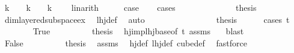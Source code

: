 \begin{isabellebody}
\ {\isachardoublequoteopen}k\ {\isacharequal}{\kern0pt}\ {}{\isachardoublequoteclose}\ {\isacharbar}{\kern0pt}\ {\isachardoublequoteopen}k\ {\isacharequal}{\kern0pt}\ {}{\isachardoublequoteclose}\ {\isacharbar}{\kern0pt}\ {\isachardoublequoteopen}k\ {\isasymge}\ {}{\isachardoublequoteclose}\ \isamarkupfalse%
\ linarith\isanewline
\ \ \isamarkupfalse%
\ \isamarkupfalse%
\ {\isacharquery}{\kern0pt}case\isanewline
\ \ \isamarkupfalse%
\ {\isacharparenleft}{\kern0pt}cases{\isacharparenright}{\kern0pt}\isanewline
\ \ \ \ \isamarkupfalse%
\ {}\isanewline
\ \ \ \ \isamarkupfalse%
\ \isamarkupfalse%
\ {\isacharquery}{\kern0pt}thesis\ \isamarkupfalse%
\ dim{}{\isacharunderscore}{\kern0pt}layered{\isacharunderscore}{\kern0pt}subspace{\isacharunderscore}{\kern0pt}ex\ \isamarkupfalse%
\ lhj{\isacharunderscore}{\kern0pt}def\ \isamarkupfalse%
\ auto\isanewline
\ \ \isamarkupfalse%
\isanewline
\ \ \ \ \isamarkupfalse%
\ {}\isanewline
\ \ \ \ \isamarkupfalse%
\ \isamarkupfalse%
\ {\isacharquery}{\kern0pt}thesis\isanewline
\ \ \ \ \isamarkupfalse%
\ {\isacharparenleft}{\kern0pt}cases\ {\isachardoublequoteopen}t\ {\isachargreater}{\kern0pt}\ {}{\isachardoublequoteclose}{\isacharparenright}{\kern0pt}\isanewline
\ \ \ \ \ \ \isamarkupfalse%
\ True\isanewline
\ \ \ \ \ \ \isamarkupfalse%
\ \isamarkupfalse%
\ {\isacharquery}{\kern0pt}thesis\ \isamarkupfalse%
\ hj{\isacharunderscore}{\kern0pt}imp{\isacharunderscore}{\kern0pt}lhj{\isacharunderscore}{\kern0pt}base{\isacharbrackleft}{\kern0pt}of\ {\isachardoublequoteopen}t{\isachardoublequoteclose}{\isacharbrackright}{\kern0pt}\ assms\ {}\ \isamarkupfalse%
\ blast\isanewline
\ \ \ \ \isamarkupfalse%
\isanewline
\ \ \ \ \ \ \isamarkupfalse%
\ False\isanewline
\ \ \ \ \ \ \isamarkupfalse%
\ \isamarkupfalse%
\ {\isacharquery}{\kern0pt}thesis\ \isamarkupfalse%
\ assms\ \isamarkupfalse%
\ hj{\isacharunderscore}{\kern0pt}def\ lhj{\isacharunderscore}{\kern0pt}def\ cube{\isacharunderscore}{\kern0pt}def\ \isamarkupfalse%
\ fastforce\isanewline
\ \ \ \ \isamarkupfalse%
\isanewline

\end{isabellebody}
